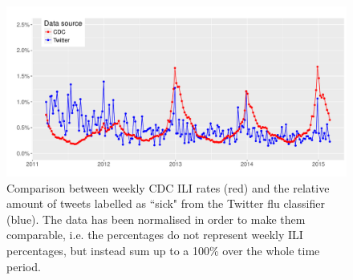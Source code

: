 \documentclass[11pt, a4paper,twoside]{report}\usepackage[]{graphicx}\usepackage[]{color}
\begin{document}
\begin{figure}[H]
  \includegraphics[width=1\linewidth]{26_cdc_twitter_comp_nat_ma1.pdf}
  \caption{}
  \caption{Comparison between weekly CDC ILI rates (red) and the relative amount of tweets labelled as ``sick" from the Twitter flu classifier (blue). The data has been normalised in order to make them comparable, i.e. the percentages do not represent weekly ILI percentages, but instead sum up to a 100\% over the whole time period.}
    \label{fig:cdc_tw_comp_nat_ma1}
\end{figure}
\end{document}
